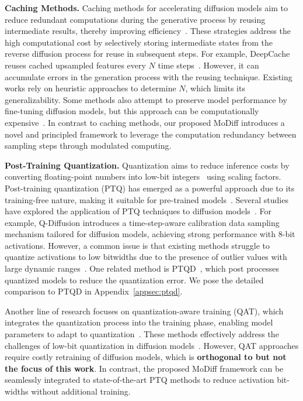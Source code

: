 \textbf{Caching Methods.}
Caching methods for accelerating diffusion models aim to reduce redundant computations during the generative process by reusing intermediate results, thereby improving efficiency~\cite{ma2024deepcache,wimbauer2024cache,ma2024learning}. These strategies address the high computational cost by selectively storing intermediate states from the reverse diffusion process for reuse in subsequent steps. For example, DeepCache reuses cached upsampled features every $N$ time steps~\citep{ma2024deepcache}. However, it can accumulate errors in the generation process with the reusing technique. Existing works rely on heuristic approaches to determine $N$, which limits its generalizability. Some methods also attempt to preserve model performance by fine-tuning diffusion models, but this approach can be computationally expensive~\citep{wimbauer2024cache,ma2024learning,chen2024delta}. In contrast to caching methods, our proposed MoDiff introduces a novel and principled framework to leverage the computation redundancy between sampling steps through modulated computing.

\textbf{Post-Training Quantization.}
Quantization aims to reduce inference costs by converting floating-point numbers into low-bit integers~\citep{nagel2021white, yang2019quantization} using scaling factors. Post-training quantization (PTQ) has emerged as a powerful approach due to its training-free nature, making it suitable for pre-trained models~\citep{li2021brecq}. Several studies have explored the application of PTQ techniques to diffusion models~\citep{li2023q, wang2024towards, huang2024tfmq, shang2023post, he2023ptqd, zhao2024vidit}. For example, Q-Diffusion introduces a time-step-aware calibration data sampling mechanism tailored for diffusion models, achieving strong performance with 8-bit activations. However, a common issue is that existing methods struggle to quantize activations to low bitwidths due to the presence of outlier values with large dynamic ranges~\citep{xiao2023smoothquant, feng2024mpq}. {One related method is PTQD~\citep{he2023ptqd}, which post processes quantized models to reduce the quantization error. We pose the detailed comparison to PTQD in Appendix~\ref{appsec:ptqd}.}

Another line of research focuses on quantization-aware training (QAT), which integrates the quantization process into the training phase, enabling model parameters to adapt to quantization~\citep{nagel2022overcoming}. These methods effectively address the challenges of low-bit quantization in diffusion models~\citep{feng2024mpq, he2023efficientdm}. However, QAT approaches require costly retraining of diffusion models, which is \textbf{orthogonal to but not the focus of this work}. In contrast, the proposed MoDiff framework can be seamlessly integrated to state-of-the-art PTQ methods to reduce activation bit-widths without additional training.



